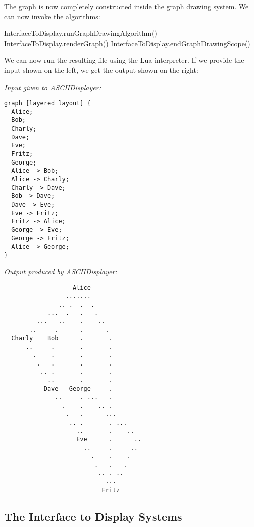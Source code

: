 The graph is now completely constructed inside the graph drawing system. We can
now invoke the algorithms:
%
\begin{codeexample}
InterfaceToDisplay.runGraphDrawingAlgorithm()
InterfaceToDisplay.renderGraph()
InterfaceToDisplay.endGraphDrawingScope()
\end{codeexample}

We can now run the resulting file using the Lua interpreter. If we provide the
input shown on the left, we get the output shown on the right:

\bigskip
\noindent
\begin{minipage}[t]{.5\textwidth}
\emph{Input given to ASCIIDisplayer:}

\begin{verbatim}
graph [layered layout] {
  Alice;
  Bob;
  Charly;
  Dave;
  Eve;
  Fritz;
  George;
  Alice -> Bob;
  Alice -> Charly;
  Charly -> Dave;
  Bob -> Dave;
  Dave -> Eve;
  Eve -> Fritz;
  Fritz -> Alice;
  George -> Eve;
  George -> Fritz;
  Alice -> George;
}
\end{verbatim}
\end{minipage}%
\begin{minipage}[t]{.49\textwidth}
\emph{Output produced by ASCIIDisplayer:}

\begin{verbatim}
                   Alice
                 .......
               .. .  .  .
            ...  .   .   .
         ...   ..    .    ..
       ..     .      .      .
  Charly    Bob      .       .
      ..     .       .       .
        .    .       .       .
         .   .       .       .
          .. .       .       .
            ..       .       .
           Dave   George     .
              ..     . ...   .
                .    .    .. .
                 .   .      ...
                  .. .       . ...
                    ..       .    ..
                    Eve      .      ..
                      ..     .     ..
                        .    .    .
                         .   .   .
                          .. . ..
                            ...
                           Fritz
\end{verbatim}
\end{minipage}


\subsection{The Interface to Display Systems}

